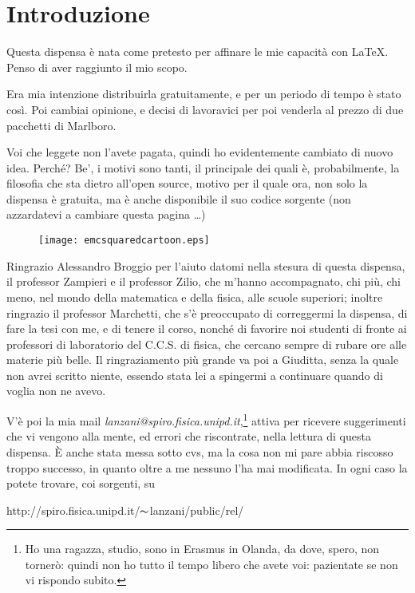 \chapter*{Introduzione}
\begin{flushright}
\end{flushright}

Questa dispensa \`e nata come pretesto per affinare le mie capacit\`a
con \LaTeX. Penso di aver raggiunto il mio scopo.

Era mia intenzione distribuirla gratuitamente, e per un periodo di tempo
\`e stato cos\`i. Poi cambiai opinione, e decisi di lavoravici per poi
venderla al prezzo di due pacchetti di Marlboro.

Voi che leggete non l'avete pagata, quindi ho evidentemente cambiato di
nuovo idea. Perch\'e? Be', i motivi sono tanti, il principale dei quali
\`e, probabilmente, la filosofia che sta dietro all'open source, motivo
per il quale ora, non solo la dispensa \`e gratuita, ma \`e anche
disponibile il suo codice sorgente (non azzardatevi a cambiare questa
pagina \dots)

\begin{wrapfigure}[10]{r}{4cm}
\texttt{[image: emcsquaredcartoon.eps]}
\end{wrapfigure}

Ringrazio Alessandro Broggio per l'aiuto datomi nella stesura di questa
dispensa, il professor Zampieri e il professor Zilio, che m'hanno
accompagnato, chi pi\`u, chi meno, nel mondo della matematica e della
fisica, alle scuole superiori; inoltre ringrazio il professor Marchetti,
che s'\`e preoccupato di correggermi la dispensa, di fare la tesi con
me, e di tenere il corso, nonch\'e di favorire noi studenti di fronte ai
professori di laboratorio del C.C.S. di fisica, che cercano sempre di
rubare ore alle materie pi\`u belle. Il ringraziamento pi\`u grande va
poi a Giuditta, senza la quale non avrei scritto niente, essendo stata
lei a spingermi a continuare quando di voglia non ne avevo.

V'\`e poi la mia mail \emph{lanzani@spiro.fisica.unipd.it},\footnote{Ho
una ragazza, studio, sono in Erasmus in Olanda, da dove,
spero, non torner\`o: quindi non ho tutto il tempo libero che avete voi:
pazientate se non vi rispondo subito.} attiva per ricevere suggerimenti
che vi vengono alla mente, ed errori che riscontrate, nella lettura di
questa dispensa. \`E anche stata messa sotto cvs, ma la cosa non mi pare
abbia riscosso troppo successo, in quanto oltre a me nessuno l'ha mai
modificata. In ogni caso la potete trovare, coi sorgenti, su
\begin{center}
	http://spiro.fisica.unipd.it/$\thicksim$lanzani/public/rel/
\end{center}

